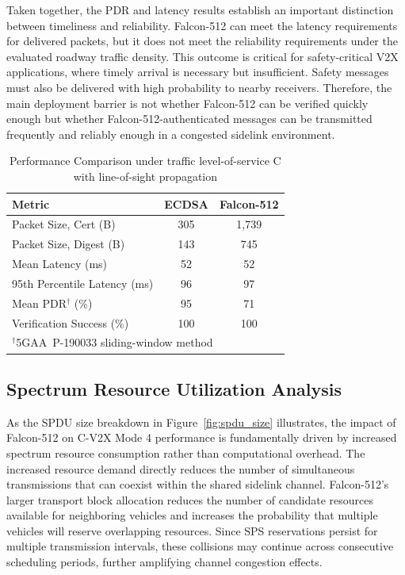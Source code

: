 \documentclass[conference]{IEEEtran}
\begin{document}
Taken together, the PDR and latency results establish an important distinction between timeliness and reliability. Falcon-512 can meet the latency requirements for delivered packets, but it does not meet the reliability requirements under the evaluated roadway traffic density. This outcome is critical for safety-critical V2X applications, where timely arrival is necessary but insufficient. Safety messages must also be delivered with high probability to nearby receivers. Therefore, the main deployment barrier is not whether Falcon-512 can be verified quickly enough but whether Falcon-512-authenticated messages can be transmitted frequently and reliably enough in a congested sidelink environment.

\begin{table}[t]
\centering
\caption{Performance Comparison under traffic level-of-service C with line-of-sight propagation}
\label{tab:results}
\begin{tabular}{lcc}
\toprule
\textbf{Metric} & \textbf{ECDSA} & \textbf{Falcon-512} \\
\midrule
Packet Size, Cert (B)         & 305   & 1,739 \\
Packet Size, Digest (B)       & 143   & 745   \\
Mean Latency (ms)             & 52 & 52 \\
95th Percentile Latency (ms)  & 96    & 97    \\
Mean PDR$^{\dagger}$ (\%)    & 95 & 71 \\
Verification Success (\%)     & 100   & 100   \\
\bottomrule
\multicolumn{3}{l}{\footnotesize $^{\dagger}$5GAA~P-190033 sliding-window method~\cite{5gaa_p190033}}
\end{tabular}
\end{table}

\subsection{Spectrum Resource Utilization Analysis}
\label{sec:spectrum}
As the SPDU size breakdown in Figure~\ref{fig:spdu_size} illustrates, the impact of Falcon-512 on C-V2X Mode 4 performance is fundamentally driven by increased spectrum resource consumption rather than computational overhead. The increased resource demand directly reduces the number of simultaneous transmissions that can coexist within the shared sidelink channel. Falcon-512's larger transport block allocation reduces the number of candidate resources available for neighboring vehicles and increases the probability that multiple vehicles will reserve overlapping resources. Since SPS reservations persist for multiple transmission intervals, these collisions may continue across consecutive scheduling periods, further amplifying channel congestion effects.
\end{document}
